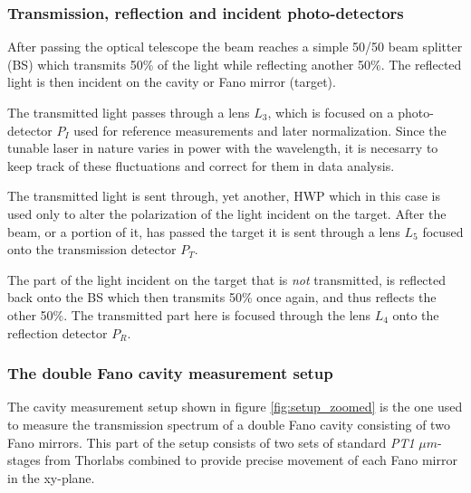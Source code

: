 \subsubsection{Transmission, reflection and incident photo-detectors}

After passing the optical telescope the beam reaches a simple 50/50 beam splitter (BS) which transmits 50\% of the light while reflecting another 50\%. The reflected light is then incident on the cavity or Fano mirror (target). 

The transmitted light passes through a lens $L_3$, which is focused on a photo-detector $P_I$ used for reference measurements and later normalization. Since the tunable laser in nature varies in power with the wavelength, it is necesarry to keep track of these fluctuations and correct for them in data analysis. 

The transmitted light is sent through, yet another, HWP which in this case is used only to alter the polarization of the light incident on the target. After the beam, or a portion of it, has passed the target it is sent through a lens $L_5$ focused onto the transmission detector $P_T$.

The part of the light incident on the target that is \emph{not} transmitted, is reflected back onto the BS which then transmits 50\% once again, and thus reflects the other 50\%. The transmitted part here is focused through the lens $L_4$ onto the reflection detector $P_R$.

\subsubsection{The double Fano cavity measurement setup}

The cavity measurement setup shown in figure \ref{fig:setup_zoomed} is the one used to measure the transmission spectrum of a double Fano cavity consisting of two Fano mirrors. This part of the setup consists of two sets of standard \emph{PT1} $\mu m$-stages from Thorlabs combined to provide precise movement of each Fano mirror in the xy-plane. 

